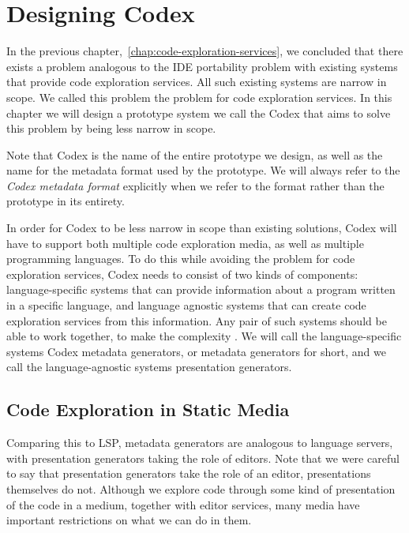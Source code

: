 
\chapter{Designing Codex}
\label{chap:designing-codex}

In the previous chapter,~\cref{chap:code-exploration-services},
we concluded that there exists a problem analogous to the IDE portability problem with existing systems that provide code exploration services.
All such existing systems are narrow in scope.
We called this problem the \problem{\times} problem for code exploration services.
In this chapter we will design a prototype system we call the Codex that aims to solve this problem by being less narrow in scope.

Note that Codex is the name of the entire prototype we design, as well as the name for the metadata format used by the prototype.
We will always refer to the \emph{Codex metadata format} explicitly when we refer to the format rather than the prototype in its entirety.

In order for Codex to be less narrow in scope than existing solutions,
Codex will have to support both multiple code exploration media, as well as multiple programming languages.
To do this while avoiding the \problem{\times} problem for code exploration services, Codex needs to consist of two kinds of components:
language-specific systems that can provide information about a program written in a specific language,
and language agnostic systems that can create code exploration services from this information.
Any pair of such systems should be able to work together, to make the complexity \problem{+}.
We will call the language-specific systems Codex metadata generators, or metadata generators for short,
and we call the language-agnostic systems presentation generators.

\section{Code Exploration in Static Media}\label{sec:code-exploration-in-static-media}

Comparing this to \ac{LSP}, metadata generators are analogous to language servers, with presentation generators taking the role of editors.
Note that we were careful to say that presentation generators take the role of an editor, presentations themselves do not.
Although we explore code through some kind of presentation of the code in a medium, together with editor services,
many media have important restrictions on what we can do in them.

